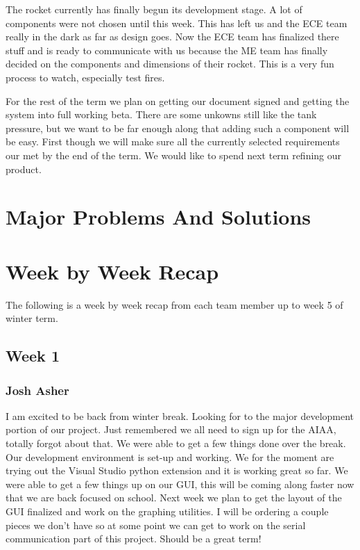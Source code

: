 \documentclass[10pt,draftclsnofoot,onecolumn]{IEEEtran}
\begin{document}
The rocket currently has finally begun its development stage. A lot of components were not chosen until this week. This has left us and the ECE team really in the dark as far as design goes. Now the ECE team has finalized there stuff and is ready to communicate with us because the ME team has finally decided on the components and dimensions of their rocket. This is a very fun process to watch, especially test fires. \par
For the rest of the term we plan on getting our document signed and getting the system into full working beta. There are some unkowns still like the tank pressure, but we want to be far enough along that adding such a component will be easy. First though we will make sure all the currently selected requirements our met by the end of the term. We would like to spend next term refining our product. \par

\section{Major Problems And Solutions}
 \par

\section{Week by Week Recap}
The following is a week by week recap from each team member up to week 5 of winter term.  \par

\subsection{Week 1}
\subsubsection{Josh Asher}
 I am excited to be back from winter break. Looking for to the major development portion of our project. Just remembered we all need to sign up for the AIAA, totally forgot about that. We were able to get a few things done over the break. Our development environment is set-up and working. We for the moment are trying out the Visual Studio python extension and it is working great so far. We were able to get a few things up on our GUI, this will be coming along faster now that we are back focused on school. Next week we plan to get the layout of the GUI finalized and work on the graphing utilities. I will be ordering a couple pieces we don't have so at some point we can get to work on the serial communication part of this project. Should be a great term! \par
\end{document}
